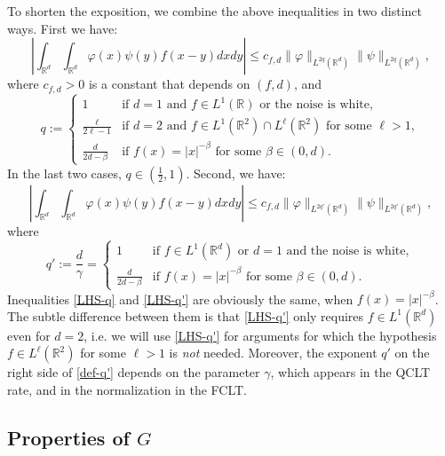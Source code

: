 \documentclass[12pt]{article}
\def\bR{\mathbb{R}}
\begin{document}
To shorten the exposition, we combine the above inequalities in two distinct ways. First we have:
\begin{equation}
\label{LHS-q}
\left|\int_{\bR^d} \int_{\bR^d}\varphi(x) \psi(y) f(x-y) dxdy\right| \leq c_{f,d} \|\varphi\|_{L^{2q}(\bR^d)}\|\psi\|_{L^{2q}(\bR^d)},
\end{equation}
where $c_{f,d}>0$ is a constant that depends on $(f,d)$, and
\begin{equation}
\label{def-q}
q:=\left\{
\begin{array}{ll} 
1 & \mbox{if $d=1$ and $f \in L^1(\bR)$ or the noise is white}, \\
\frac{\ell}{2\ell-1} & \mbox{if $d = 2$ and $f \in L^1(\bR^2) \cap L^{\ell}(\bR^2)$ for some $\ell >1$}, \\
\frac{d}{2d-\beta} & \mbox{if $f(x)=|x|^{-\beta}$ for some $\beta \in (0,d)$}.
\end{array} \right.
\end{equation}
In the last two cases, $q \in (\frac12,1)$. Second, we have:
\begin{equation}
\label{LHS-q'}
\left|\int_{\bR^d} \int_{\bR^d}\varphi(x) \psi(y) f(x-y) dxdy\right| \leq c_{f,d} \|\varphi\|_{L^{2q'}(\bR^d)}\|\psi\|_{L^{2q'}(\bR^d)},
\end{equation}
where
\begin{equation}
\label{def-q'}
q':=\frac{d}{\gamma}=\left\{
\begin{array}{ll} 
1 & \mbox{if $f \in L^1(\bR^d)$ or $d=1$ and the noise is white}, \\
\frac{d}{2d-\beta} & \mbox{if $f(x)=|x|^{-\beta}$ for some $\beta \in (0,d)$}.
\end{array} \right.
\end{equation}
Inequalities \eqref{LHS-q} and \eqref{LHS-q'} are obviously the same, when $f(x)=|x|^{-\beta}$.
The subtle difference between them is that \eqref{LHS-q'} only requires $f \in L^1(\bR^d)$ even for $d=2$, i.e. we will use \eqref{LHS-q'} for arguments for which the hypothesis $f \in L^{\ell}(\bR^2)$ for some $\ell>1$ is {\em not} needed. Moreover, the exponent $q'$ on the right side of \eqref{def-q'} depends on the parameter $\gamma$, which appears in the QCLT rate, and in the normalization in the FCLT. 

\subsection{Properties of $G$}
\end{document}
